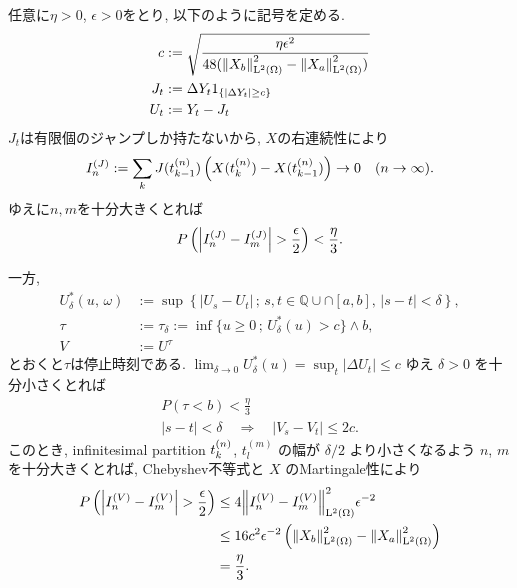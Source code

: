 \documentclass{ltjsarticle}
\begin{document}
\begin{prf}

	任意に\( \eta > 0 \), \( \epsilon > 0 \)をとり, 以下のように記号を定める.
	\begin{align*}
		c   & := \sqrt{ \frac{ \eta \epsilon^2 }{ 48 (\left\| X_b \right\|_{\mathrm{L}^2(\Omega)}^2 - \left\| X_a \right\|_{\mathrm{L}^2(\Omega)}^2) } } \\
		J_t & := \Delta Y_t1_{ \{ | \Delta Y_t | \ge c\} }                                 \\
		U_t & := Y_t - J_t
	\end{align*}
	\( J_ t \)は有限個のジャンプしか持たないから, \( X \)の右連続性により
	\[
		I_n^{ (J) } := \sum_k J(t_{k-1}^{(n)}) \left(X(t_k^{(n)}) - X(t_{k-1}^{(n)}) \right) \to 0
		\quad (n \to \infty).
	\]
	ゆえに\( n,m \)を十分大きくとれば
	\begin{equation}		\label{ IJprob }
		P \left(	\left| I_n^{ (J) } - I_m^{ (J) } \right| > \frac {\epsilon}{2} \right) < \frac {\eta}{3}.
	\end{equation}
	
	一方, 
	\begin{align*}
		U_{\delta}^*(u,\,\omega)
		     & := \sup 
		\left\{ 
		| U_s - U_t | \,;\,
		s,t \in \mathbb{Q} \cup
		\cap [a,b], \, |s - t| < \delta 
		\right\},
		\\
		\tau & := \tau_{\delta} :=
		\inf 
		\{
		u \ge 0 \,;\, 
		U_{\delta}^*(u) > c 
		\}	\wedge b,
		\\
		V    & := U^{\tau}
	\end{align*}
	とおくと\( \tau \)は停止時刻である.
	\( \lim_{ \delta \to 0 } U_{ \delta }^*( u ) = \sup_t | \Delta U_t | \le c \) ゆえ
	\( \delta > 0 \) を十分小さくとれば
	\begin{gather*}
		P(	\tau < b	) < \frac {\eta}{3}	\\	
		|s-t| < \delta
		\quad \Rightarrow \quad
		|V_s - V_t| \le 2c.
	\end{gather*}
	このとき, infinitesimal partition \( t_k^{(n)} \), \( t_l^{(m)} \) の幅が \( \delta / 2 \) より小さくなるよう
	\( n \), \( m \) を十分大きくとれば, Chebyshev不等式と \( X \) のMartingale性により
	\begin{align}	\label { IVprob }
		P\left(	\left| I_n^{ (V) } - I_m^{ (V) } \right| > \frac{ \epsilon }{ 2 }	\right)
		 & \le 4{ \left\|  I_n^{ (V) } - I_m^{ (V) } \right\|_{\mathrm{L}^2(\Omega)}^2 } {\epsilon} ^{-2}                   \\
		 & \le 16c^2 \epsilon ^{-2} \left( \left\| X_b \right\|_{\mathrm{L}^2(\Omega)}^2 - \left\| X_a \right\|_{\mathrm{L}^2(\Omega)}^2 \right) \\
		 & =	\frac{ \eta }{ 3 }.
	\end{align}
	

\end{prf}
\end{document}
